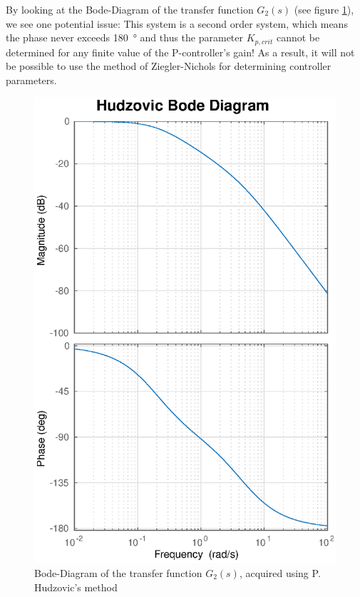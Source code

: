 By looking  at  the Bode-Diagram of the transfer function $G_2(s)$ (see figure
\ref{fig:hudzovic_bode}), we see one potential issue: This system  is a second
order system, which means  the  phase never exceeds \SI{180}{\degree} and thus
the parameter $K_{p,crit}$ cannot be  determined  for  any finite value of the
P-controller's gain! As a result, it will not be possible to use the method of
Ziegler-Nichols for determining controller parameters.

\begin{figure}[t]
    \centering
    \includegraphics[width=\linewidth]{images/hudzovic_bode}
    \caption{Bode-Diagram of the transfer function $G_2(s)$, acquired using P. Hudzovic's method}
    \label{fig:hudzovic_bode}
\end{figure}

